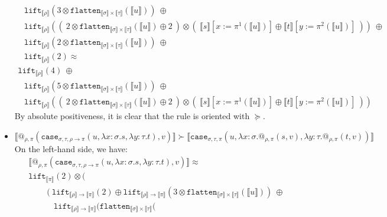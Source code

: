 \documentclass[runningheads,a4paper]{llncs}
\newcommand{\typeinterpret}[1]{\llbracket #1 \rrbracket}
\newcommand{\interpret}[1]{\llbracket #1 \rrbracket}
\newcommand{\arrtype}{\rightarrow}
\newcommand{\abs}[2]{\lambda #1.#2}
\newcommand{\flatten}{\mathtt{flatten}}
\newcommand{\lift}{\mathtt{lift}}
\begin{document}
\begin{itemize}
\[\begin{array}{l}
  \phantom{A}
  \lift_{\typeinterpret{\rho}}(3 \otimes \flatten_{\typeinterpret{
    \sigma} \times \typeinterpret{\tau}}(\interpret{u}))\ \oplus \\
  \phantom{A}
  \lift_{\typeinterpret{\rho}}((\ 2 \otimes \flatten_{\typeinterpret{
    \sigma} \times \typeinterpret{\tau}}(\interpret{u}) \oplus 2\ )
    \otimes (\ \interpret{s}[x:=\pi^1(\interpret{u})] \oplus
    \interpret{t}[y:=\pi^2(\interpret{u})]\ ))\ \oplus \\
  \phantom{A}
  \lift_{\typeinterpret{\rho}}(2 \otimes \flatten_{\typeinterpret{\sigma}
    \times \typeinterpret{\tau}}(\interpret{u}))\ \oplus \\
  \phantom{A}
    \lift_{\typeinterpret{\rho}}(2) \approx \\
  \lift_{\typeinterpret{\rho}}(4)\ \oplus \\
  \phantom{A}
  \lift_{\typeinterpret{\rho}}(5 \otimes \flatten_{\typeinterpret{
    \sigma} \times \typeinterpret{\tau}}(\interpret{u}))\ \oplus \\
  \phantom{A}
  \lift_{\typeinterpret{\rho}}((\ 2 \otimes \flatten_{\typeinterpret{
    \sigma} \times \typeinterpret{\tau}}(\interpret{u}) \oplus 2\ )
    \otimes (\ \interpret{s}[x:=\pi^1(\interpret{u})] \oplus
    \interpret{t}[y:=\pi^2(\interpret{u})]\ ) )
  \end{array}
  \]
  By absolute positiveness, it is clear that the rule is oriented
  with $\succeq$.
\item $\interpret{@_{\rho,\pi}(\mathtt{case}_{\sigma,\tau,\rho
  \arrtype \pi}(u,\abs{x:\sigma}{s},\abs{y:\tau}{t}),v)} \succ
  \interpret{\mathtt{case}_{\sigma,\tau,\pi}(u,\abs{x:\sigma}{
  @_{\rho,\pi}(s,v)},\abs{y:\tau}{@_{\rho,\pi}(t,v)})}$ \\
  On the left-hand side, we have:
  \[
  \begin{array}{l}
  \interpret{@_{\rho,\pi}(\mathtt{case}_{\sigma,\tau,\rho \arrtype
  \pi}(u,\abs{x:\sigma}{s},\abs{y:\tau}{t}),v)} \approx \\
  \lift_{\typeinterpret{\pi}}(2) \otimes (\\
    \phantom{ABC}
    (\ \lift_{\typeinterpret{\rho} \arrtype \typeinterpret{\pi}}(2)
       \oplus \lift_{\typeinterpret{\rho} \arrtype
       \typeinterpret{\pi}}(3 \otimes \flatten_{\typeinterpret{\sigma}
       \times \typeinterpret{\tau}}(\interpret{u}))\ \oplus \\
    \phantom{ABCD}
      \lift_{\typeinterpret{\rho} \arrtype \typeinterpret{\pi}}(
      \flatten_{\typeinterpret{\sigma} \times \typeinterpret{\tau}}(

\end{array}\]
\end{itemize}
\end{document}
